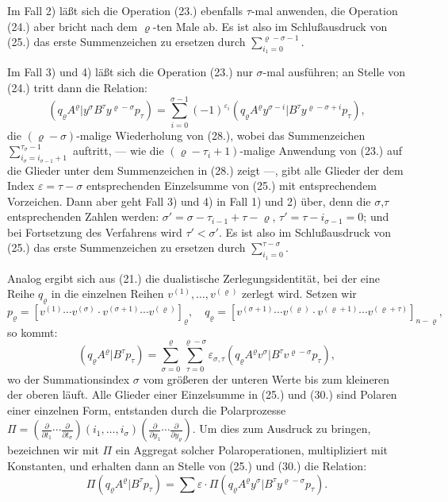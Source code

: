 \documentclass[12pt,a4paper]{article}
\begin{document}
Im Fall 2) läßt sich die Operation (23.) ebenfalls $\tau$-mal anwenden, die Operation (24.) aber bricht nach dem $\varrho$-ten Male ab. Es ist also im Schlußausdruck von (25.) das erste Summenzeichen zu ersetzen durch $\sum_{i_{1}=0}^{\varrho-\sigma-1}$.

Im Fall 3) und 4) läßt sich die Operation (23.) nur $\sigma$-mal ausführen; an Stelle von (24.) tritt dann die Relation:
\begin{equation}\tag{28}
(q_{\varrho} A^{\varrho} | y^{\sigma} B^{\tau} y^{\varrho-\sigma} p_{\tau}) = \sum_{i=0}^{\sigma-1} (-1)^{\varepsilon_{i}} (q_{\varrho} A^{\varrho} y^{\sigma-i} | B^{\tau} y^{\varrho-\sigma+i} p_{\tau}),
\end{equation}
die $(\varrho-\sigma)$-malige Wiederholung von (28.), wobei das Summenzeichen $\sum_{i_{\sigma}=i_{\sigma-1}+1}^{\tau_{\sigma}-1}$ auftritt, --- wie die $(\varrho-\tau_{i}+1)$-malige Anwendung von (23.) auf die Glieder unter dem Summenzeichen in (28.) zeigt ---, gibt alle Glieder der dem Index $\varepsilon = \tau - \sigma$ entsprechenden Einzelsumme von (25.) mit entsprechendem Vorzeichen. Dann aber geht Fall 3) und 4) in Fall 1) und 2) über, denn die $\sigma$,$\tau$ entsprechenden Zahlen werden: $\sigma' = \sigma - \tau_{i-1} + \tau - \varrho$, $\tau' = \tau - i_{\sigma-1} = 0$; und bei Fortsetzung des Verfahrens wird $\tau' < \sigma'$. Es ist also im Schlußausdruck von (25.) das erste Summenzeichen zu ersetzen durch $\sum_{i_{1}=0}^{\tau-\sigma}$.

Analog ergibt sich aus (21.) die dualistische Zerlegungsidentität, bei der eine Reihe $q_{\varrho}$ in die einzelnen Reihen $v^{(1)}, \ldots, v^{(\varrho)}$ zerlegt wird. Setzen wir
\begin{equation}\tag{29}
p_{\varrho} = [v^{(1)} \cdots v^{(\sigma)} \cdot v^{(\sigma+1)} \cdots v^{(\varrho)}]_{\varrho}, \quad q_{\varrho} = [v^{(\sigma+1)} \cdots v^{(\varrho)} \cdot v^{(\varrho+1)} \cdots v^{(\varrho+\tau)}]_{n-\varrho},
\end{equation}
so kommt:
\begin{equation}\tag{30}
(q_{\varrho} A^{\varrho} | B^{\tau} p_{\tau}) = \sum_{\sigma=0}^{\varrho} \sum_{\tau=0}^{\varrho-\sigma} \varepsilon_{\sigma,\tau} (q_{\varrho} A^{\varrho} v^{\sigma} | B^{\tau} v^{\varrho-\sigma} p_{\tau}),
\end{equation}
wo der Summationsindex $\sigma$ vom größeren der unteren Werte bis zum kleineren der oberen läuft. Alle Glieder einer Einzelsumme in (25.) und (30.) sind Polaren einer einzelnen Form, entstanden durch die Polarprozesse $\Pi = (\frac{\partial}{\partial t_{1}} \cdots \frac{\partial}{\partial t_{\sigma}})(i_{1}, \ldots, i_{\sigma}) (\frac{\partial}{\partial y_{1}} \cdots \frac{\partial}{\partial y_{\varrho}})$. Um dies zum Ausdruck zu bringen, bezeichnen wir mit $\Pi$ ein Aggregat solcher Polaroperationen, multipliziert mit Konstanten, und erhalten dann an Stelle von (25.) und (30.) die Relation:
\begin{equation}\tag{31}
\Pi(q_{\varrho} A^{\varrho} | B^{\tau} p_{\tau}) = \sum \varepsilon \cdot \Pi(q_{\varrho} A^{\varrho} y^{\sigma} | B^{\tau} y^{\varrho-\sigma} p_{\tau}).
\end{equation}
\end{document}
